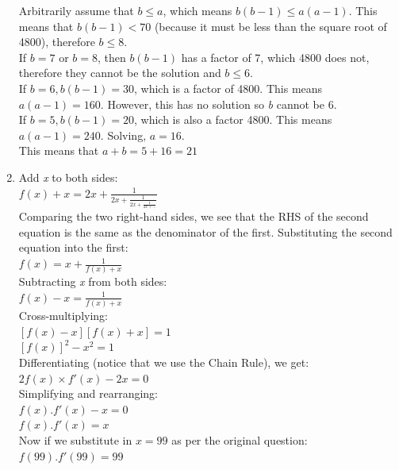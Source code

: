 \documentclass[../main.tex]{subfiles}
\begin{document}
\begin{enumerate}
    Arbitrarily assume that \(b\leq a\), which means \(b(b-1) \leq a(a-1)\). This means that \(b(b-1) < 70\) (because it must be less than the square root of 4800), therefore \(b \leq 8\).\\

    If \(b=7\) or \(b=8\), then \(b(b-1)\) has a factor of 7, which 4800 does not, therefore they cannot be the solution and \(b \leq 6\).\\

    If \(b=6, b(b-1)=30\), which is a factor of 4800. This means \(a(a-1)=160\). However, this has no solution so \textit{b} cannot be 6.\\

    If \(b=5, b(b-1)=20\), which is also a factor 4800. This means \(a(a-1)=240\). Solving, \(a=16\).\\

    This means that \(a+b=5+16=21\)\\
    
    \item 
    Add \textit{x} to both sides:\\
    \(f(x)+x=2x+\frac{1}{2x+\frac{1}{2x+\frac{1}{2x+...}}}\)\\
    
    Comparing the two right-hand sides, we see that the RHS of the second equation is the same as the denominator of the first. Substituting the second equation into the first:\\
    \(f(x)=x+\frac{1}{f(x)+x}\)\\

    Subtracting \textit{x} from both sides:\\
    \(f(x)-x=\frac{1}{f(x)+x}\)\\

    Cross-multiplying:\\
    \([f(x)-x][f(x)+x]=1\)\\
    \([f(x)]^2-x^2=1\)\\

    Differentiating (notice that we use the Chain Rule), we get:\\
    \(2f(x)\times f'(x)-2x=0\)\\
    
    Simplifying and rearranging:\\
    \(f(x).f'(x)-x=0\)\\
    \(f(x).f'(x)=x\)\\

    Now if we substitute in \(x=99\) as per the original question:\\
    \(f(99).f'(99)=99\)\\


\end{enumerate}
\end{document}
